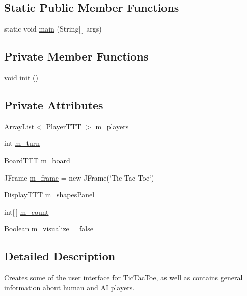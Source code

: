 \subsection*{Static Public Member Functions}
\begin{DoxyCompactItemize}
\item 
static void \hyperlink{class_game_1_1_game_t_t_t_a039bbaac8ea491c16fa231a69fd3b664}{main} (String\mbox{[}$\,$\mbox{]} args)
\end{DoxyCompactItemize}
\subsection*{Private Member Functions}
\begin{DoxyCompactItemize}
\item 
void \hyperlink{class_game_1_1_game_t_t_t_a34f74c29027f3e658cf080336255a533}{init} ()
\end{DoxyCompactItemize}
\subsection*{Private Attributes}
\begin{DoxyCompactItemize}
\item 
Array\+List$<$ \hyperlink{class_player_1_1_player_t_t_t}{Player\+T\+T\+T} $>$ \hyperlink{class_game_1_1_game_t_t_t_aad75ff74595b7b58542d7060a77ca169}{m\+\_\+players}
\item 
int \hyperlink{class_game_1_1_game_t_t_t_a2a4f4d1d24717d2629a2560421e926bc}{m\+\_\+turn}
\item 
\hyperlink{class_board_1_1_board_t_t_t}{Board\+T\+T\+T} \hyperlink{class_game_1_1_game_t_t_t_a7da768af1eaf7e75452a54391961275f}{m\+\_\+board}
\item 
J\+Frame \hyperlink{class_game_1_1_game_t_t_t_a1ddfe813d586411f16504069d6bddf5d}{m\+\_\+frame} = new J\+Frame(\char`\"{}Tic Tac Toe\char`\"{})
\item 
\hyperlink{class_display_1_1_display_t_t_t}{Display\+T\+T\+T} \hyperlink{class_game_1_1_game_t_t_t_a6b2de64f05009047dd3a01867da865c0}{m\+\_\+shapes\+Panel}
\item 
int\mbox{[}$\,$\mbox{]} \hyperlink{class_game_1_1_game_t_t_t_a79f50cdad0e0978bb30ac4ba2a96a971}{m\+\_\+count}
\item 
Boolean \hyperlink{class_game_1_1_game_t_t_t_ad1efe890e60af4826d664276e1e49ea4}{m\+\_\+visualize} = false
\end{DoxyCompactItemize}


\subsection{Detailed Description}
Creates some of the user interface for Tic\+Tac\+Toe, as well as contains general information about human and A\+I players. 

